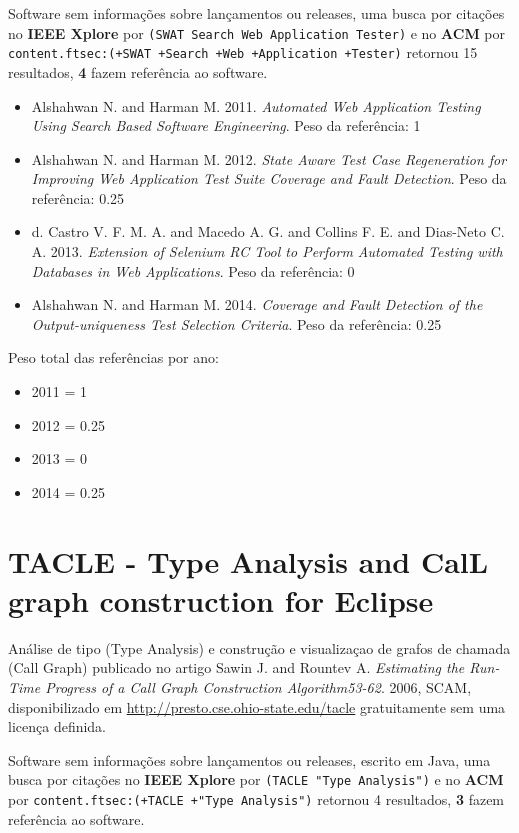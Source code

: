 Software sem informações sobre lançamentos ou releases,
uma busca por citações no {\bf IEEE Xplore} por
\texttt{(SWAT Search Web Application Tester)}
e no {\bf ACM} por
\texttt{content.ftsec:(+SWAT +Search +Web +Application +Tester)}
retornou
15 resultados,
{\bf 4} fazem referência ao software.

\begin{itemize}
\item Alshahwan N. and Harman M.
      2011.
      {\it Automated Web Application Testing Using Search Based Software Engineering}.
      Peso da referência: 1
\item Alshahwan N. and Harman M.
      2012.
      {\it State Aware Test Case Regeneration for Improving Web Application Test Suite Coverage and Fault Detection}.
      Peso da referência: 0.25
\item d. Castro V. F. M. A. and Macedo A. G. and Collins F. E. and Dias-Neto C. A.
      2013.
      {\it Extension of Selenium RC Tool to Perform Automated Testing with Databases in Web Applications}.
      Peso da referência: 0
\item Alshahwan N. and Harman M.
      2014.
      {\it Coverage and Fault Detection of the Output-uniqueness Test Selection Criteria}.
      Peso da referência: 0.25
\end{itemize}

Peso total das referências por ano:

\begin{itemize}
\item 2011 = 1
\item 2012 = 0.25
\item 2013 = 0
\item 2014 = 0.25
\end{itemize}


\section{TACLE - Type Analysis and CalL graph construction for Eclipse}

Análise de tipo (Type Analysis) e construção e visualizaçao de grafos de chamada (Call Graph)
publicado no artigo
Sawin J. and Rountev A.
{\it Estimating the Run-Time Progress of a Call Graph Construction Algorithm53-62}.
2006,
SCAM,
disponibilizado em \url{http://presto.cse.ohio-state.edu/tacle}
gratuitamente
sem uma licença definida.

Software sem informações sobre lançamentos ou releases,
escrito em Java,
uma busca por citações no {\bf IEEE Xplore} por
\texttt{(TACLE "Type Analysis")}
e no {\bf ACM} por
\texttt{content.ftsec:(+TACLE +"Type Analysis")}
retornou
4 resultados,
{\bf 3} fazem referência ao software.

